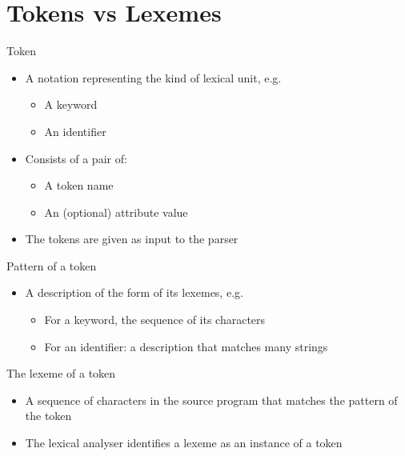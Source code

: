 \documentclass{article}[18pt]
\begin{document}
\section{Tokens vs Lexemes}
Token
\begin{itemize}
	\item A notation representing the kind of lexical unit, e.g.
	\begin{itemize}
		\item A keyword
		\item An identifier
	\end{itemize}
	\item Consists of a pair of:
	\begin{itemize}
		\item A token name
		\item An (optional) attribute value
	\end{itemize}
	\item The tokens are given as input to the parser
\end{itemize}
Pattern of a token
\begin{itemize}
	\item A description of the form of its lexemes, e.g.
	\begin{itemize}
		\item For a keyword, the sequence of its characters
		\item For an identifier: a description that matches many strings
	\end{itemize}
\end{itemize}
The lexeme of a token
\begin{itemize}
	\item A sequence of characters in the source program that matches the pattern of the token
	\item The lexical analyser identifies a lexeme as an instance of a token
\end{itemize}
\end{document}

